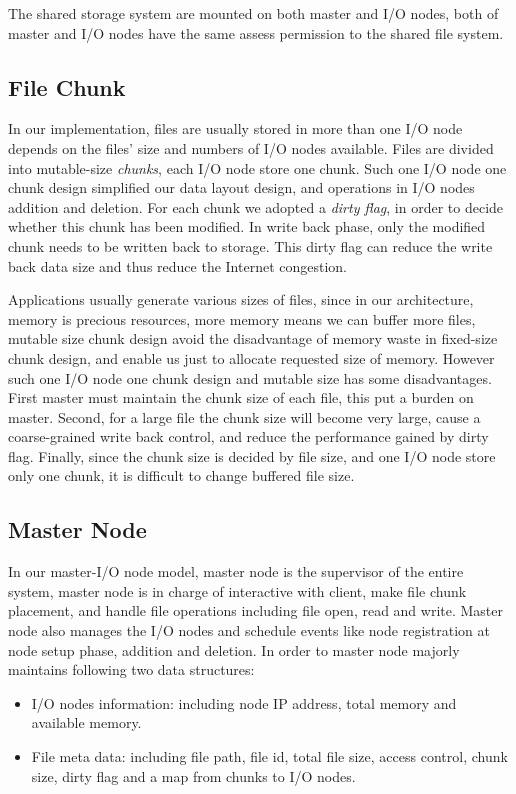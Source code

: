 The shared storage system are mounted on both master and I/O nodes, both of master and I/O nodes
have the same assess permission to the shared file system.

\subsection{File Chunk}
In our implementation, files are usually stored in more than one I/O node depends on the files'
size and numbers of I/O nodes available.
Files are divided into mutable-size \emph{chunks}, each I/O node store one chunk.
Such one I/O node one chunk design simplified our data layout design, and operations in I/O nodes addition and deletion.
For each chunk we adopted a \emph{dirty flag}, in order to decide whether this chunk has been modified.
In write back phase, only the modified chunk needs to be written back to storage.
This dirty flag can reduce the write back data size and thus reduce the Internet congestion.

Applications usually generate various sizes of files, since in our architecture, memory is precious
resources, more memory means we can buffer more files, mutable size chunk design avoid the
disadvantage of memory waste in fixed-size chunk design, and enable us just to allocate requested size of memory.
However such one I/O node one chunk design and mutable size has some disadvantages.
First master must maintain the chunk size of each file, this put a burden on master.
Second, for a large file the chunk size will become very large, cause a coarse-grained write back
control, and reduce the performance gained by dirty flag.
Finally, since the chunk size is decided by file size, and one I/O node store only one chunk, it is
difficult to change buffered file size.

\subsection{Master Node}
In our master-I/O node model, master node is the supervisor of the entire system,
master node is in charge of interactive with client, make file chunk placement, and handle file operations including file open, read and write.
Master node also manages the I/O nodes and schedule events like node registration at node setup
phase, addition and deletion.
In order to master node majorly maintains following two data structures:
\begin{itemize}
  \item I/O nodes information: including node IP address, total memory and available memory.
  \item File meta data: including file path, file id, total file size, access control, chunk size,
  dirty flag and a map from chunks to I/O nodes.
\end{itemize}

